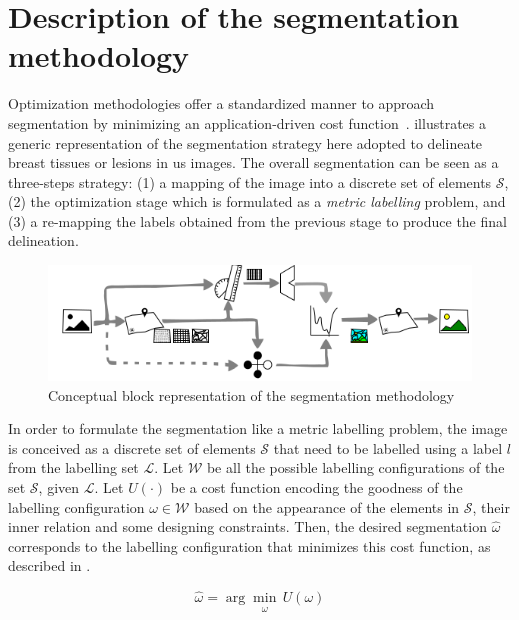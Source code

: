 \graphicspath{ {./content/method/figures/visual_cues/}{./content/method/figures/}}

\section{Description of the segmentation methodology} 

Optimization methodologies offer a standardized manner to approach segmentation by minimizing an application-driven cost function~\cite{cremers2007review}.
 illustrates a generic representation of the segmentation strategy here adopted to delineate breast tissues or lesions in \ac{us} images. 
The overall segmentation can be seen as a three-steps strategy: 
(1) a mapping of the image into a discrete set of elements $\mathcal{S}$, 
(2) the optimization stage which is formulated as a \emph{metric labelling} problem, 
and (3) a re-mapping the labels obtained from the previous stage to produce the final delineation. 

\begin{figure}[htpb]
  \centering
  \includegraphics[width=0.9\linewidth]{method}
  \caption{Conceptual block representation of the segmentation methodology}
  \label{fig:method}
\end{figure}


In order to formulate the segmentation like a metric labelling problem, the image is conceived as a discrete set of elements $\mathcal{S}$ that need to be labelled using a label $l$ from the labelling set $\mathcal{L}$.
Let $\mathcal{W}$ be all the possible labelling configurations of the set $\mathcal{S}$, given $\mathcal{L}$.
Let $U(\cdot)$ be a cost function encoding the goodness of the labelling configuration $\omega \in \mathcal{W}$ based on the appearance of the elements in $\mathcal{S}$, their inner relation and some designing constraints.
Then, the desired segmentation $\hat{\omega}$ corresponds to the labelling configuration that minimizes this cost function, as described in .

\begin{equation}
\hat{\omega} = \arg \min_{\substack{\omega}} \,U(\omega)
\label{eq:costMin}
\end{equation}

